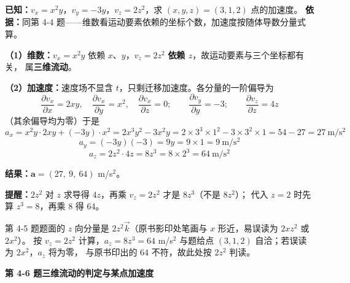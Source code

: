 \begin{jie}
\textbf{已知：}$v_x=x^2y$，$v_y=-3y$，$v_z=2z^2$，求 $(x,y,z)=(3,1,2)$ 点的加速度。
\textbf{依据：}同第 4-4 题——维数看运动要素依赖的坐标个数，加速度按随体导数分量式算。

\textbf{（1）维数：}$v_x=x^2y$ 依赖 $x$、$y$，$v_z=2z^2$ \textbf{依赖 $z$}，故运动要素与三个坐标都有关，
属\textbf{三维流动}。

\textbf{（2）加速度：}速度场不显含 $t$，只剩迁移加速度。各分量的一阶偏导为
\[ \frac{\partial v_x}{\partial x}=2xy,\quad\frac{\partial v_x}{\partial y}=x^2,\quad\frac{\partial v_x}{\partial z}=0;\qquad
   \frac{\partial v_y}{\partial y}=-3;\qquad \frac{\partial v_z}{\partial z}=4z \]
（其余偏导均为零）于是
\[ a_x=x^2y\cdot2xy+(-3y)\cdot x^2=2x^3y^2-3x^2y=2\times3^3\times1^2-3\times3^2\times1=54-27=27\ \mathrm{m/s^2} \]
\[ a_y=(-3y)(-3)=9y=9\times1=9\ \mathrm{m/s^2} \]
\[ a_z=2z^2\cdot4z=8z^3=8\times2^3=64\ \mathrm{m/s^2} \]

\textbf{结果：}$\bm{a}=(27,\ 9,\ 64)$ m/s$^2$。

\textbf{提醒：}$2z^2$ 对 $z$ 求导得 $4z$，再乘 $v_z=2z^2$ 才是 $8z^3$（不是 $8z^2$）；
代入 $z=2$ 时先算 $z^3=8$，再乘 8 得 64。
\end{jie}

\begin{tishi}
第 4-5 题题面的 $z$ 向分量是 $2z^2\vec k$（原书影印处笔画与 $x$ 形近，易误读为 $2xz^2$ 或 $2x^2$）。
按 $v_z=2z^2$ 计算，$a_z=8z^3=64$ m/s$^2$ 与题给点 $(3,1,2)$ 自洽；若误读为 $2x^2$，$a_z$ 将为零，
与原书印出的 64 不符，故此处按 $2z^2$ 判读。
\end{tishi}

\noindent\textbf{第 4-6 题\quad 三维流动的判定与某点加速度}

